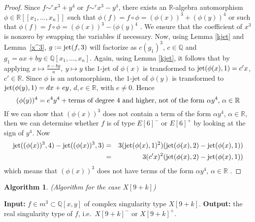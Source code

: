 \documentclass{amsproc}
\begin{document}
\begin{proof}
Since $f\sim^r x^3+y^4$ or $f\sim^rx^3-y^4$, there exists an $\mathbb R$-algebra automorphism $\phi\in\mathbb R[[x_1,\ldots,x_n]]$ such that $\phi(f)=f\circ\phi=(\phi(x))^3+(\phi(y))^4$ or such that $\phi(f)=f\circ\phi=(\phi(x))^3-(\phi(y)^4$ . We ensure that the coefficient of $x^3$ is nonzero by swapping the variables if necessary. Now, using Lemma \ref{kjet} and Lemma~\ref{x^3}, $g:=\textnormal{jet}(f,3)$ will factorize as $c(g_1)^3$, $c\in\mathbb Q$ and $g_1=ax+by\in\mathbb Q[x_1,\ldots,x_n]$. Again, using Lemma \ref{kjet}, it follows that by applying $x\mapsto\frac{x-by}{a},\ y\mapsto y$ the $1$-jet of $\phi(x)$ is transformed to $\textnormal{jet}(\phi(x),1)=c'x$, $c'\in\mathbb R$. Since $\phi$ is an automorphism, the $1$-jet of $\phi(y)$ is transformed to $\textnormal{jet}(\phi(y),1)=dx+ey$, $d,e\in\mathbb R$, with $e\neq 0$. Hence
\begin{equation*}
(\phi(y))^4=e^4y^4+\textnormal{terms of degree 4 and higher, not of the form $\alpha y^4$, $\alpha\in\mathbb R$}
\end{equation*}
If we can show that $(\phi(x))^3$ does not contain a term of the form $\alpha y^4$, $\alpha\in\mathbb R$, then we can determine whether $f$ is of type $E[6]^-$ or $E[6]^+$ by looking at the sign of $y^4$. Now 
\begin{eqnarray*}
\textnormal{jet}((\phi(x))^3,4)-\textnormal{jet}((\phi(x))^3,3)&=&3(\textnormal{jet}(\phi(x),1)^2)(\textnormal{jet}(\phi(x),2)-\textnormal{jet}(\phi(x),1))\\&=&3(c'x)^2(\textnormal{jet}(\phi(x),2)-\textnormal{jet}(\phi(x),1))
\end{eqnarray*}
 which means that $(\phi(x))^3$ does not have terms of the form $\alpha y^4$, $\alpha\in\mathbb R$ .   
\end{proof}
\newtheorem{X[9+k]}[kjet]{Algorithm}
\begin{X[9+k]}(Algorithm for the case $X[9+k]$)
\end{X[9+k]}
\noindent\textnormal{\bf Input:} $f\in m^3\subset\mathbb Q[x,y]$ of complex singularity type $X[9+k]$.\newline
\textnormal{\bf Output:} the real singularity type of $f$, i.e.~$X[9+k]^-$ or $X[9+k]^+$.
\end{document}
